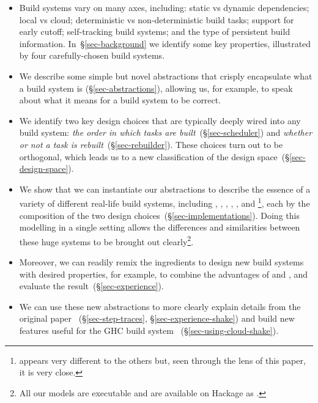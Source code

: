 \begin{itemize}
\item Build systems vary on many axes, including: static vs dynamic
  dependencies; local vs cloud; deterministic vs non-deterministic build tasks;
  support for early cutoff; self-tracking build systems; and the type of
  persistent build information. In~\S\ref{sec-background} we identify some key
  properties, illustrated by four carefully-chosen build systems.

\item We describe some simple but novel abstractions that
  crisply encapsulate what a build system is (\S\ref{sec-abstractions}),
  allowing us, for example, to speak about what it means for a build system to be correct.

\item We identify two key design choices that are typically deeply wired into
  any build system: \emph{the order in which tasks are
  built}~(\S\ref{sec-scheduler}) and \emph{whether or not a
  task is rebuilt}~(\S\ref{sec-rebuilder}). These choices turn out to
  be orthogonal, which leads us to a new classification of the design
  space~(\S\ref{sec-design-space}).

\item We show that we can instantiate our abstractions to describe the essence
of a variety of different real-life build systems, including \Make, \Shake,
\Bazel, \Buck, \Nix, and \Excel\footnote{\Excel appears very different to the
others but, seen through the lens of this paper, it is very close.}, each by the
composition of the two design choices~(\S\ref{sec-implementations}). Doing this
modelling in a single setting allows the differences and similarities between
these huge systems to be brought out clearly\footnote{All our models are
executable and are available on Hackage as .}.

\item Moreover, we can readily remix the ingredients to design new build systems
with desired properties, for example, to combine the advantages of \Shake and
\Bazel, and evaluate the result~(\S\ref{sec-experience}).

\item We can use these new
abstractions to more clearly explain details from the original \Shake
paper~\cite{mitchell2012shake} (\S\ref{sec-step-traces}, \S\ref{sec-experience-shake})
and build new features useful for the GHC build system~\cite{hadrian} (\S\ref{sec-using-cloud-shake}).

\end{itemize}

